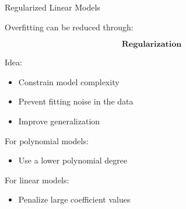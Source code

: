 \documentclass[aspectratio=169]{beamer}
\begin{document}
\begin{frame}{Regularized Linear Models}
	
	Overfitting can be reduced through:
	
	\[
	\textbf{Regularization}
	\]
	
	\vspace{0.5em}
	
	Idea:
	\begin{itemize}
		\item Constrain model complexity
		\item Prevent fitting noise in the data
		\item Improve generalization
	\end{itemize}
	
	\vspace{0.5em}
	
	For polynomial models:
	\begin{itemize}
		\item Use a lower polynomial degree
	\end{itemize}
	
	\vspace{0.5em}
	
	For linear models:
	\begin{itemize}
		\item Penalize large coefficient values
	\end{itemize}
	
\end{frame}

\end{document}
